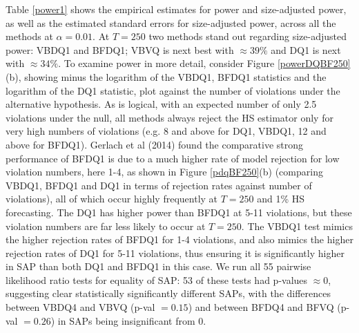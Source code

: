 \documentclass[12pt,epsf]{article}
\begin{document}
Table \ref{power1} shows the empirical estimates for power and size-adjusted power, as well as the estimated standard errors for
size-adjusted power, across all the methods at $\alpha=0.01$. At $T=250$ two methods stand out regarding size-adjusted power: VBDQ1 and BFDQ1;
VBVQ is next best with $\approx 39\%$ and DQ1 is next with $\approx 34\%$. To examine power in more detail, consider
Figure \ref{powerDQBF250}(b), showing minus the logarithm of the VBDQ1, BFDQ1 statistics and the logarithm of the DQ1 statistic, 
plot against the number of violations under the alternative hypothesis. As is logical, with an expected number of only 2.5 
violations under the null, all methods always reject the HS estimator only for very high numbers of violations (e.g. 8 and above for DQ1, 
VBDQ1, 12 and above for BFDQ1).
Gerlach et al (2014) found the comparative strong performance of BFDQ1 is due to a much higher rate of model rejection for
low violation numbers, here 1-4, as shown in Figure \ref{pdqBF250}(b) (comparing VBDQ1, BFDQ1 and DQ1 in terms of rejection rates
against number of violations), all of which occur highly frequently at $T=250$ and 1\% HS forecasting. The DQ1 has higher power than
BFDQ1 at 5-11 violations, but these violation numbers are far less likely to occur at $T=250$. The VBDQ1 test mimics the 
higher rejection rates of BFDQ1 for 1-4 violations, and also mimics the higher rejection rates of DQ1 for 5-11 violations, thus ensuring 
it is significantly higher in SAP than both DQ1 and BFDQ1 in this case. We run all 55 pairwise
likelihood ratio tests for equality of SAP: 53 of these tests had p-values $\approx 0$, suggesting clear
statistically significantly different SAPs, with the differences between VBDQ4 and VBVQ (p-val $= 0.15$) and between BFDQ4 and BFVQ
(p-val $= 0.26$) in SAPs being insignificant from 0.
\end{document}
